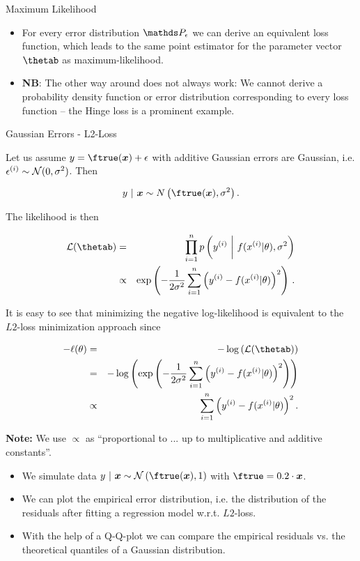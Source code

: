 \begin{vbframe}{Maximum Likelihood}
\begin{itemize}
\framebreak 

\item For every error distribution $\P_\eps$ we can derive an equivalent loss function, which leads to the same point estimator for the parameter vector $\thetab$ as maximum-likelihood.
\lz
\item \textbf{NB}: The other way around does not always work: We cannot derive a probability density function or error distribution corresponding to every loss function -- the Hinge loss is a prominent example.
\end{itemize}

\end{vbframe}


\begin{vbframe}{Gaussian Errors - L2-Loss} 

Let us assume $y = \ftrue(\xv) + \eps$ with additive Gaussian errors are Gaussian, i.e. $\epsilon^{(i)} \sim \mathcal{N}(0, \sigma^2)$. Then

$$y~|~\xv \sim N\left(\ftrue(\xv), \sigma^2\right).$$


The likelihood is then 

\begin{eqnarray*}
\LL(\thetab) &=& \prod_{i=1}^n \pdf\left(\yi ~\bigg|~ \fxit, \sigma^2\right) \\ &\propto& \exp\left(-\frac{1}{2\sigma^2}\sumin \left(\yi - \fxit\right)^2\right)\,.
\end{eqnarray*}

\framebreak 

It is easy to see that minimizing the negative log-likelihood is equivalent to the $L2$-loss minimization approach since

\begin{eqnarray*}
- \llt &=& - \log\left(\LL(\thetab)\right) \\
&=& - \log\left(\exp\left(-\frac{1}{2\sigma^2}\sumin \left(\yi - \fxit\right)^2\right)\right) \\
&\propto& \sumin \left(\yi - \fxit\right)^2.
\end{eqnarray*}


\begin{footnotesize}
\textbf{Note:} We use $\propto$ as \enquote{proportional to ... up to multiplicative and additive constants}. 
\end{footnotesize}

\framebreak 

\begin{footnotesize}
\begin{itemize}
	\item We simulate data $y ~|~\xv \sim \mathcal{N}\left(\ftrue(\xv), 1\right)$ with $\ftrue = 0.2 \cdot \xv$. 
\item We can plot the empirical error distribution, i.e. the distribution of the residuals after fitting a regression model w.r.t. $L2$-loss.
\item With the help of a Q-Q-plot we can compare the empirical residuals vs. the theoretical quantiles of a Gaussian distribution.  
\end{itemize}
\end{footnotesize}


\end{vbframe}
